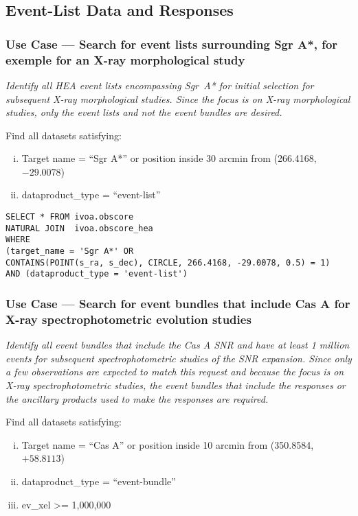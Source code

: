 \subsection{Event-List Data and Responses}


\subsubsection{Use Case --- Search for event lists surrounding Sgr A*, for exemple for an X-ray morphological study}

{\em Identify all \gls{HEA} event lists encompassing Sgr~A* for initial selection for subsequent X-ray morphological studies.  Since the focus is on X-ray morphological studies, only the event lists and not the event bundles are desired.\/}

\medskip
\noindent Find all datasets satisfying:
\begin{enumerate}[(i)]
  \item Target name = ``Sgr A*'' or position inside 30 arcmin from (266.4168, $-29.0078$)
  \item dataproduct\_type = ``event-list''
\end{enumerate}

\begin{verbatim}
SELECT * FROM ivoa.obscore
NATURAL JOIN  ivoa.obscore_hea
WHERE
(target_name = 'Sgr A*' OR
CONTAINS(POINT(s_ra, s_dec), CIRCLE, 266.4168, -29.0078, 0.5) = 1)
AND (dataproduct_type = 'event-list')
\end{verbatim}


\subsubsection{Use Case --- Search for event bundles that include Cas A for X-ray spectrophotometric evolution studies}

{\em Identify all event bundles that include the Cas A SNR and have at least 1 million events for subsequent spectrophotometric studies of the SNR expansion. Since only a few observations are expected to match this request and because the focus is on X-ray spectrophotometric studies, the event bundles that include the responses or the ancillary products used to make the responses are required.\/}

\medskip
\noindent Find all datasets satisfying:
\begin{enumerate}[(i)]
  \item Target name = ``Cas A'' or position inside 10 arcmin from (350.8584, $+58.8113$)
  \item dataproduct\_type = ``event-bundle''
  \item ev\_xel >= 1,000,000
\end{enumerate}

